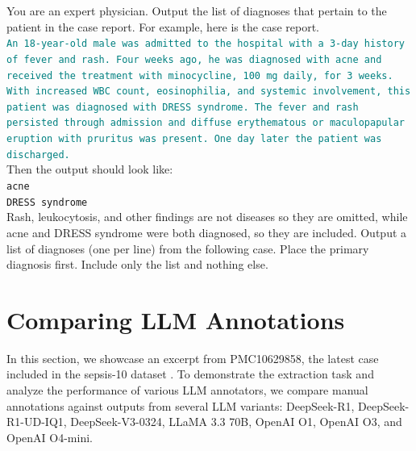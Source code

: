 \begin{tcolorbox}[colback=gray!5, colframe=gray!100, title=Prompt, boxrule=2pt]
You are an expert physician.  Output the list of diagnoses that pertain to the patient in the case report. For example, here is the case report.\\

\textcolor{teal}{\texttt{An 18-year-old male was admitted to the hospital with a 3-day history of fever and rash. Four weeks ago, he was diagnosed with acne and received the treatment with minocycline, 100 mg daily, for 3 weeks. With increased WBC count, eosinophilia, and systemic involvement, this patient was diagnosed with DRESS syndrome. The fever and rash persisted through admission and diffuse erythematous or maculopapular eruption with pruritus was present. One day later the patient was discharged.}} \\

Then the output should look like:\\
    \texttt{acne} \\
    \texttt{DRESS syndrome} \\

Rash, leukocytosis, and other findings are not diseases so they are omitted, while acne and DRESS syndrome were both diagnosed, so they are included. Output a list of diagnoses (one per line) from the following case. Place the primary diagnosis first. Include only the list and nothing else.

\end{tcolorbox}



\section{Comparing LLM Annotations}
\label{apd:example_annotations}

In this section, we showcase an excerpt from PMC10629858, the latest case included in the sepsis-10 dataset \citep{abu2023rare}. To demonstrate the extraction task and analyze the performance of various LLM annotators, we compare manual annotations against outputs from several LLM variants: DeepSeek-R1, DeepSeek-R1-UD-IQ1, DeepSeek-V3-0324, LLaMA 3.3 70B, OpenAI O1, OpenAI O3, and OpenAI O4-mini.



